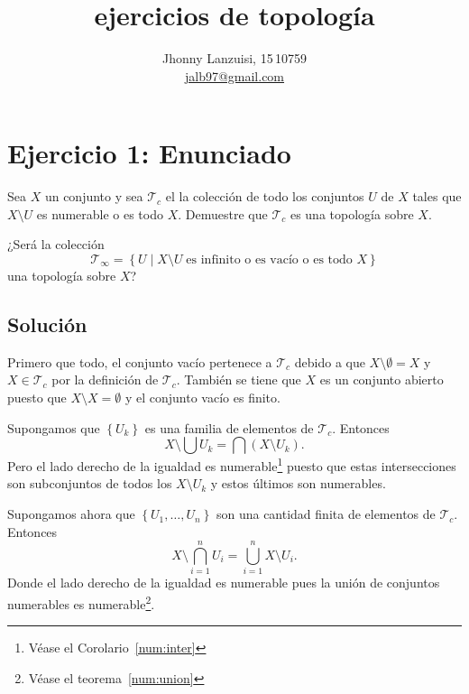 \documentclass[fleqn,leqno,11pt,letterpaper,final]{article}
\title{ejercicios de topología}
\author{Jhonny Lanzuisi, 15\,10759\\\url{jalb97@gmail.com}}
\begin{document}
\maketitle
\tableofcontents

\section{Ejercicio 1: Enunciado}
\hspace{-.6em}\footnotemark Sea $X$ un conjunto y sea $\mathcal{T}_c$ el la
colección de todo los conjuntos $U$ de $X$ tales que
$X\setminus U$ es numerable o es todo $X$. Demuestre
que $\mathcal{T}_c$ es una topología sobre $X$.

¿Será la colección
\[
\mathcal{T}_\infty = \left\{ U \mid X\setminus U\;
\text{es infinito o es vacío o es todo $X$} \right\}
\]
una topología sobre $X$?

\subsection{Solución}

Primero que todo, el conjunto vacío pertenece a $
\mathcal{T}_c $ debido a que $ X\setminus\emptyset=X
$ y $X\in \mathcal{T}_c$ por la definición de
$\mathcal{T}_c$.  También se
tiene que $ X $ es un conjunto abierto puesto que $
X\setminus X=\emptyset $ y el conjunto vacío es finito.

Supongamos que $
\left\{ U_k \right\}$ es una familia de elementos de $
\mathcal{T}_c $.  Entonces%
\[
X\setminus\bigcup U_k= \bigcap (X\setminus U_k).
\]
Pero el lado derecho de la igualdad es numerable\footnote{Véase el Corolario~\ref{num:inter}} puesto
que estas intersecciones son subconjuntos de todos los
$ X\setminus U_k $ y estos últimos son numerables.

Supongamos ahora que $ \left\{ U_1,\dots,U_n \right\} $
son una cantidad finita de elementos de $
\mathcal{T}_c. $ Entonces
\[
X\setminus\bigcap_{i=1}^{n}U_i =
\bigcup_{i=1}^{n} X\setminus U_i.
\]
Donde el lado derecho de la igualdad es numerable pues
la unión de conjuntos numerables es numerable\footnote{Véase el teorema~\ref{num:union}}.
\end{document}
